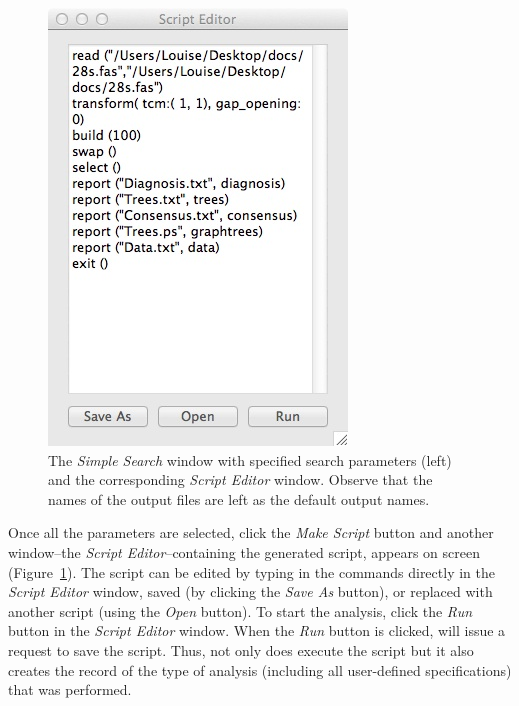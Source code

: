 \begin{figure}
\begin{minipage}[c]{0.52\textwidth}
	   	\includegraphics[width=\textwidth]{doc/figures/simplesearch_script.jpg}
   	\end{minipage}
	
    \caption{The \emph{Simple Search} window with specified search parameters (left) and the corresponding 
    \emph{Script Editor} window. Observe that the names of the output files are left as the default output names.}
    \label{fig:ScriptEditor_Window}
\end{figure}

Once all the parameters are selected, click the \emph{Make Script} button and another
window--the \emph{Script Editor}--containing the generated script, appears on screen (Figure~\ref{fig:ScriptEditor_Window}). 
The script can be edited by typing in the commands directly in the \emph{Script Editor} window,
 saved (by clicking the \emph{Save As} button), or replaced with another script (using 
 the \emph{Open} button). To start the analysis, click the \emph{Run} button in the 
 \emph{Script Editor} window. When the \emph{Run} button is clicked, \poy will issue a
 request to save the script. Thus, not only does \poy execute the script but
 it also creates the record of the type of analysis (including all user-defined specifications) that was performed.
 
